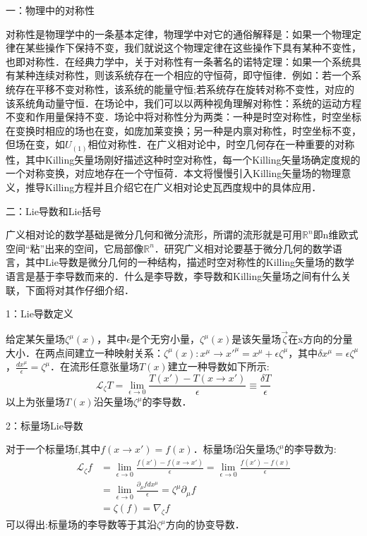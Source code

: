 
一：物理中的对称性

对称性是物理学中的一条基本定律，物理学中对它的通俗解释是：如果一个物理定律在某些操作下保持不变，我们就说这个物理定律在这些操作下具有某种不变性，也即对称性．在经典力学中，关于对称性有一条著名的诺特定理：如果一个系统具有某种连续对称性，则该系统存在一个相应的守恒荷，即守恒律．例如：若一个系统存在平移不变对称性，该系统的能量守恒;若系统存在旋转对称不变性，对应的该系统角动量守恒．在场论中，我们可以以两种视角理解对称性：系统的运动方程不变和作用量保持不变．场论中将对称性分为两类：一种是时空对称性，时空坐标在变换时相应的场也在变，如庞加莱变换；另一种是内禀对称性，时空坐标不变，但场在变，如$U_{(1)}$相位对称性．在广义相对论中，时空几何存在一种重要的对称性，其中Killing矢量场刚好描述这种时空对称性，每一个Killing矢量场确定度规的一个对称变换，对应地存在一个守恒荷．本文将慢慢引入Killing矢量场的物理意义，推导Killing方程并且介绍它在广义相对论史瓦西度规中的具体应用．

 二：Lie导数和Lie括号

广义相对论的数学基础是微分几何和微分流形，所谓的流形就是可用$\mathbb{R}^{n}$即n维欧式空间“粘”出来的空间，它局部像$\mathbb{R}^{n}$．研究广义相对论要基于微分几何的数学语言，其中Lie导数是微分几何的一种结构，描述时空对称性的Killing矢量场的数学语言是基于李导数而来的．什么是李导数，李导数和Killing矢量场之间有什么关联，下面将对其作仔细介绍．

1：Lie导数定义

给定某矢量场$\zeta^{\mu}(x)$，其中$\epsilon$是个无穷小量，$\zeta^{\mu}(x)$是该矢量场$\overrightarrow{\zeta}$在x方向的分量大小．在两点间建立一种映射关系：$\zeta^{\mu}(x):x^{\mu}\rightarrow x'^{\mu}=x^{\mu}+\epsilon\zeta^{\mu}$，其中$\delta x^{\mu}=\epsilon\zeta^{\mu}$，$\frac{d x^{\mu}}{\epsilon}=\zeta^{\mu}$．在流形任意张量场$T(x)$建立一种导数如下所示:
$$\begin{equation}
\mathcal{L}_{\zeta}T=\lim_{\epsilon\rightarrow0}\frac{T(x')-T(x\rightarrow x')}{\epsilon}\equiv \frac{\delta T}{\epsilon}
\end{equation}$$
以上为张量场$T(x)$沿矢量场$\zeta^{\mu}$的李导数．

2：标量场Lie导数

对于一个标量场f,其中$f(x\rightarrow x')=f(x)$．标量场f沿矢量场$\zeta^{\mu}$的李导数为:
$$\begin{aligned}
\mathcal{L}_{\zeta} f &=\lim _{\epsilon \rightarrow 0} \frac{f(x')-f(x \rightarrow x')}{\epsilon}=\lim _{\epsilon \rightarrow 0} \frac{f(x')-f(x)}{\epsilon} \\
&=\lim _{\epsilon\rightarrow 0} \frac{\partial_{\mu} fd x^{\mu}}{\epsilon}=\zeta^{\mu}\partial_{\mu}f \\
&=\zeta(f)=\nabla_{\zeta}f
\end{aligned}$$
可以得出:标量场的李导数等于其沿$\zeta^{\mu}$方向的协变导数．

